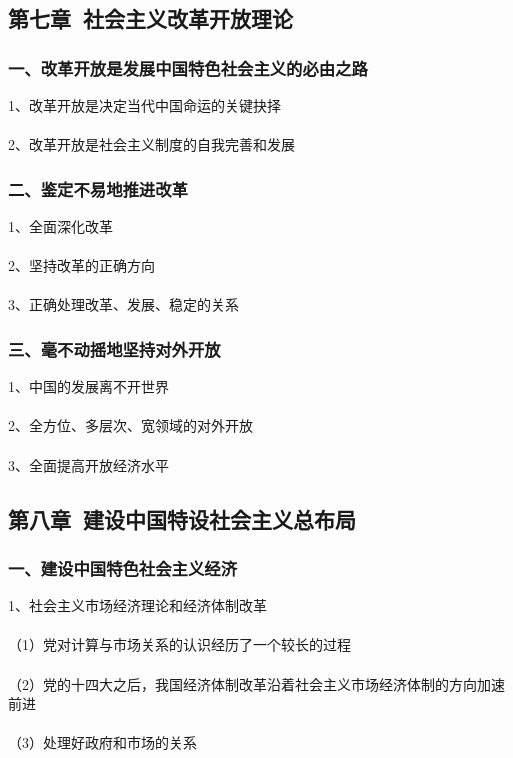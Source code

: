 \documentclass{ctexart}
\begin{document}
\subsection{第七章\ 社会主义改革开放理论}
\subsubsection{一、改革开放是发展中国特色社会主义的必由之路}
1、改革开放是决定当代中国命运的关键抉择
\\\\

2、改革开放是社会主义制度的自我完善和发展

\subsubsection{二、鉴定不易地推进改革}
1、全面深化改革
\\\\

2、坚持改革的正确方向
\\\\

3、正确处理改革、发展、稳定的关系

\subsubsection{三、毫不动摇地坚持对外开放}
1、中国的发展离不开世界
\\\\

2、全方位、多层次、宽领域的对外开放
\\\\

3、全面提高开放经济水平



\subsection{第八章\ 建设中国特设社会主义总布局}
\subsubsection{一、建设中国特色社会主义经济}
1、社会主义市场经济理论和经济体制改革
\\\\
（1）党对计算与市场关系的认识经历了一个较长的过程
\\\\
（2）党的十四大之后，我国经济体制改革沿着社会主义市场经济体制的方向加速前进
\\\\
（3）处理好政府和市场的关系
\\\\
\end{document}
